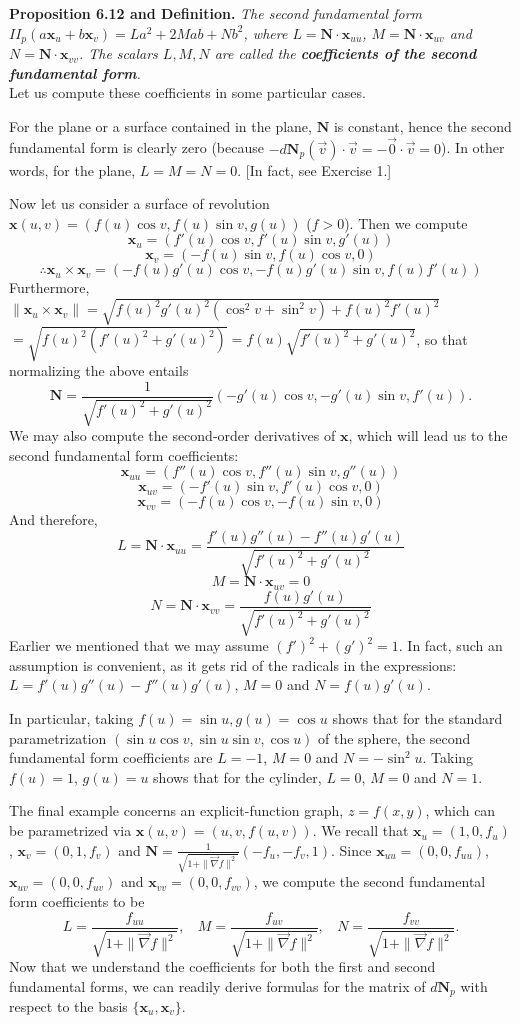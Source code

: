 \documentclass[leqno]{book}
\begin{document}
\noindent\textbf{Proposition 6.12 and Definition.} \emph{The second fundamental form $I\!I_p(a\mathbf x_u+b\mathbf x_v)=La^2+2Mab+Nb^2$, where $L=\mathbf N\cdot\mathbf x_{uu}$, $M=\mathbf N\cdot\mathbf x_{uv}$ and $N=\mathbf N\cdot\mathbf x_{vv}$.  The scalars $L,M,N$ are called the \textbf{coefficients of the second fundamental form}.}\\

\noindent Let us compute these coefficients in some particular cases.

For the plane or a surface contained in the plane, $\mathbf N$ is constant, hence the second fundamental form is clearly zero (because $-d\mathbf N_p(\vec v)\cdot\vec v=-\vec 0\cdot\vec v=0$).  In other words, for the plane, $L=M=N=0$.  [In fact, see Exercise 1.]

Now let us consider a surface of revolution $\mathbf x(u,v)=(f(u)\cos v,f(u)\sin v,g(u))$ ($f>0$).  Then we compute
$$\mathbf x_u=(f'(u)\cos v,f'(u)\sin v,g'(u))$$
$$\mathbf x_v=(-f(u)\sin v,f(u)\cos v,0)$$
$$\therefore\mathbf x_u\times\mathbf x_v=(-f(u)g'(u)\cos v,-f(u)g'(u)\sin v,f(u)f'(u))$$
Furthermore, $\|\mathbf x_u\times\mathbf x_v\|=\sqrt{f(u)^2g'(u)^2(\cos^2v+\sin^2v)+f(u)^2f'(u)^2}$\\
\noindent$=\sqrt{f(u)^2(f'(u)^2+g'(u)^2)}=f(u)\sqrt{f'(u)^2+g'(u)^2}$, so that normalizing the above entails
$$\mathbf N=\frac 1{\sqrt{f'(u)^2+g'(u)^2}}(-g'(u)\cos v,-g'(u)\sin v,f'(u)).$$
We may also compute the second-order derivatives of $\mathbf x$, which will lead us to the second fundamental form coefficients:
$$\mathbf x_{uu}=(f''(u)\cos v,f''(u)\sin v,g''(u))$$
$$\mathbf x_{uv}=(-f'(u)\sin v,f'(u)\cos v,0)$$
$$\mathbf x_{vv}=(-f(u)\cos v,-f(u)\sin v,0)$$
And therefore,
$$L=\mathbf N\cdot\mathbf x_{uu}=\frac{f'(u)g''(u)-f''(u)g'(u)}{\sqrt{f'(u)^2+g'(u)^2}}$$
$$M=\mathbf N\cdot\mathbf x_{uv}=0$$
$$N=\mathbf N\cdot\mathbf x_{vv}=\frac{f(u)g'(u)}{\sqrt{f'(u)^2+g'(u)^2}}$$
Earlier we mentioned that we may assume $(f')^2+(g')^2=1$.  In fact, such an assumption is convenient, as it gets rid of the radicals in the expressions: $L=f'(u)g''(u)-f''(u)g'(u)$, $M=0$ and $N=f(u)g'(u)$.

In particular, taking $f(u)=\sin u,g(u)=\cos u$ shows that for the standard parametrization $(\sin u\cos v,\sin u\sin v,\cos u)$ of the sphere, the second fundamental form coefficients are $L=-1$, $M=0$ and $N=-\sin^2u$.  Taking $f(u)=1$, $g(u)=u$ shows that for the cylinder, $L=0$, $M=0$ and $N=1$.

The final example concerns an explicit-function graph, $z=f(x,y)$, which can be parametrized via $\mathbf x(u,v)=(u,v,f(u,v))$.  We recall that $\mathbf x_u=(1,0,f_u)$, $\mathbf x_v=(0,1,f_v)$ and $\mathbf N=\frac 1{\sqrt{1+\|\vec\nabla f\|^2}}(-f_u,-f_v,1)$.  Since $\mathbf x_{uu}=(0,0,f_{uu})$, $\mathbf x_{uv}=(0,0,f_{uv})$ and $\mathbf x_{vv}=(0,0,f_{vv})$, we compute the second fundamental form coefficients to be
$$L=\frac{f_{uu}}{\sqrt{1+\|\vec\nabla f\|^2}},~~~~M=\frac{f_{uv}}{\sqrt{1+\|\vec\nabla f\|^2}},~~~~N=\frac{f_{vv}}{\sqrt{1+\|\vec\nabla f\|^2}}.$$
Now that we understand the coefficients for both the first and second fundamental forms, we can readily derive formulas for the matrix of $d\mathbf N_p$ with respect to the basis $\{\mathbf x_u,\mathbf x_v\}$.
\end{document}
